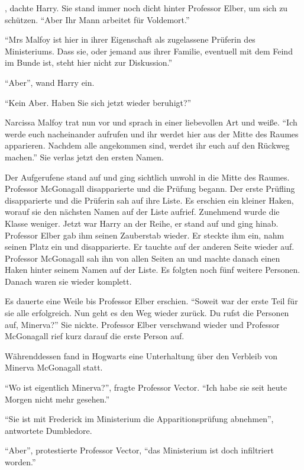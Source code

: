 , dachte Harry. Sie stand immer noch dicht hinter Professor Elber, um sich zu schützen. \enquote{Aber Ihr Mann arbeitet für Voldemort.}

\enquote{Mrs Malfoy ist hier in ihrer Eigenschaft als zugelassene Prüferin des Ministeriums. Dass sie, oder jemand aus ihrer Familie, eventuell mit dem Feind im Bunde ist, steht hier nicht zur Diskussion.}

\enquote{Aber}, wand Harry ein.

\enquote{Kein Aber. Haben Sie sich jetzt wieder beruhigt?}

Narcissa Malfoy trat nun vor und sprach in einer liebevollen Art und weiße. \enquote{Ich werde euch nacheinander aufrufen und ihr werdet hier aus der Mitte des Raumes apparieren. Nachdem alle angekommen sind, werdet ihr euch auf den Rückweg machen.} Sie verlas jetzt den ersten Namen.

Der Aufgerufene stand auf und ging sichtlich unwohl in die Mitte des Raumes. Professor McGonagall disapparierte und die Prüfung begann. Der erste Prüfling disapparierte und die Prüferin sah auf ihre Liste. Es erschien ein kleiner Haken, worauf sie den nächsten Namen auf der Liste aufrief. Zunehmend wurde die Klasse weniger. Jetzt war Harry an der Reihe, er stand auf und ging hinab. Professor Elber gab ihm seinen Zauberstab wieder. Er steckte ihm ein, nahm seinen Platz ein und disapparierte. Er tauchte auf der anderen Seite wieder auf. Professor McGonagall sah ihn von allen Seiten an und machte danach einen Haken hinter seinem Namen auf der Liste. Es folgten noch fünf weitere Personen. Danach waren sie wieder komplett.

Es dauerte eine Weile bis Professor Elber erschien. \enquote{Soweit war der erste Teil für sie alle erfolgreich. Nun geht es den Weg wieder zurück. Du rufst die Personen auf, Minerva?} Sie nickte. Professor Elber verschwand wieder und Professor McGonagall rief kurz darauf die erste Person auf.

Währenddessen fand in Hogwarts eine Unterhaltung über den Verbleib von Minerva McGonagall statt.

\enquote{Wo ist eigentlich Minerva?}, fragte Professor Vector. \enquote{Ich habe sie seit heute Morgen nicht mehr gesehen.}

\enquote{Sie ist mit Frederick im Ministerium die Apparitionsprüfung abnehmen}, antwortete Dumbledore.

\enquote{Aber}, protestierte Professor Vector, \enquote{das Ministerium ist doch infiltriert worden.}


